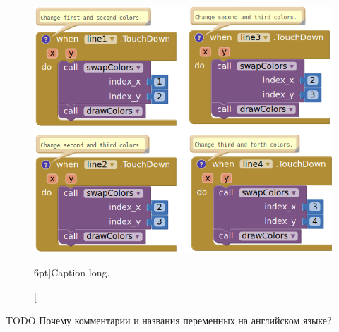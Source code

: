 \begin{figure}
  \includegraphics{./graphics/programs/change_flags/click_and_swap_colors_2018.png}
    \caption[Caption short.][6pt]{Caption long.
    }
  \label{fig:block:click:swap:colors}
\end{figure}

TODO Почему комментарии и названия переменных на английском языке?
